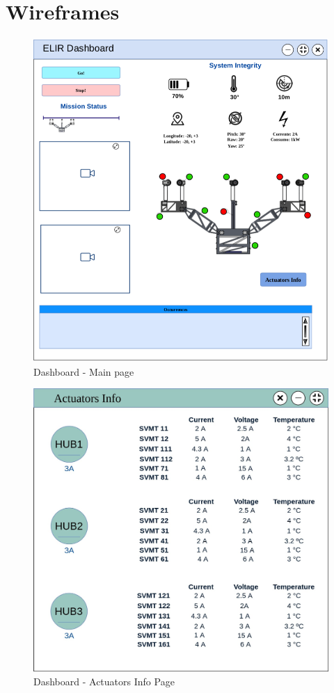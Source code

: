 
\chapter{Wireframes}
\label{Append:wireframes}


	\begin{figure}[!ht]
	\centering
	\includegraphics[width=14cm]{Figures/GUI_1.png}
	\caption{Dashboard - Main page} \label{fig:UI}
	\end{figure}
	
	\begin{figure}[!ht]
	\centering
	\includegraphics[width=16cm]{Figures/GUI_2.jpg}
	\caption{Dashboard - Actuators Info Page} \label{fig:UI2}
	\end{figure}